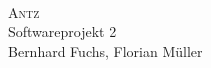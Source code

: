




\begin{titlepage}
   \mbox{}\vspace{5\baselineskip}\\
   \rmfamily\huge
   \centering
   \textsc{Antz} \\[2ex]
   Softwareprojekt 2
   \rmfamily\Large
   \vspace{1\baselineskip}\\
   \vspace{5\baselineskip}
   \rmfamily\Large
   Bernhard Fuchs, Florian Müller
   \vspace{1\baselineskip}\\
   \date{30. Mai 2014}
\end{titlepage}
 



% 

